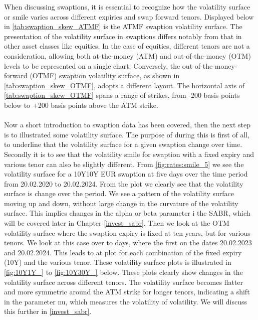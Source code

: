 \newpage
\noindent
When discussing swaptions, it is essential to recognize how the volatility surface or smile varies across different expiries and swap 
forward tenors. Displayed below in \autoref{tab:swaption_skew_ATMF} is the ATMF swaption volatility surface. 
The presentation of the volatility surface in swaptions differs notably from that in other asset classes like equities. 
In the case of equities, different tenors are not a consideration, allowing both at-the-money (ATM) and out-of-the-money (OTM) 
levels to be represented on a single chart. Conversely, the out-of-the-money-forward (OTMF) swaption volatility surface, 
as shown in \autoref{tab:swaption_skew_OTMF}, adopts a different layout. The horizontal axis of 
\autoref{tab:swaption_skew_OTMF} spans a range of strikes, from -200 basis points below to +200 basis points above the ATM strike.
\\\\
Now a short introduction to swaption data has been covered, then the next step is to illustrated some 
volatility surface. The purpose of during this is first of all, to underline that the volatility surface for a 
given swaption change over time. Secondly it is to see that the volatility smile for swaption with a fixed
expiry and various tenor can also be slightly different.  From \autoref{fig:rates:smile_5} we see the volatility surface
for a 10Y10Y EUR swaption at five days over the time period from 20.02.2020 to 20.02.2024. From the plot 
we clearly see that the volatility surface is change over the period. We see a pattern of the volatility surface moving 
up and down, without large change in the curvature of the volatility surface. This implies changes in the alpha or beta parameter
i the SABR, which will be covered later in Chapter \ref{invest_sabr}. Then we look at the OTM volatility surface
where the swaption expiry is fixed at ten years, but for various tenors. We look at this case over to days, where the first 
on the dates 20.02.2023 and 20.02.2024. This leads to at plot for each combination of the fixed expiry (10Y) and the various tenor. 
These volatility surface plots is illustrated in \autoref{fig:10Y1Y_} to \autoref{fig:10Y30Y_} below.
These plots clearly show changes in the volatility surface across different tenors. 
The volatility surface becomes flatter and more symmetric around the ATM strike for longer tenors, 
indicating a shift in the parameter nu, which measures the volatility of volatility. We will discuss 
this further in \ref{invest_sabr}.
\\
